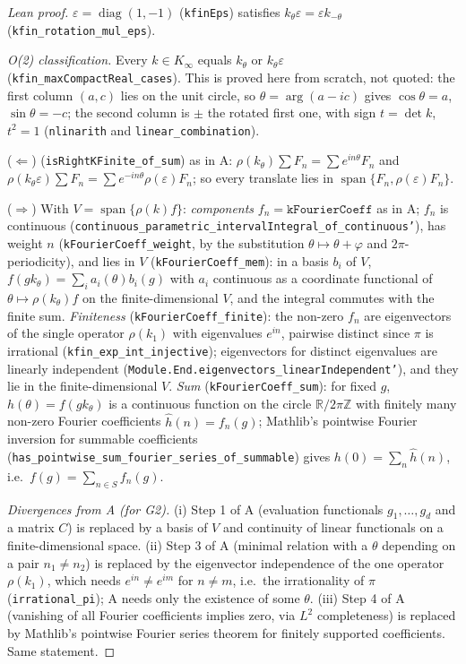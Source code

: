 \begin{proof}[Lean proof]
$\varepsilon=\operatorname{diag}(1,-1)$ (\texttt{kfinEps}) satisfies $k_\theta\varepsilon=\varepsilon k_{-\theta}$ (\texttt{kfin\_rotation\_mul\_eps}).

\emph{O(2) classification.} Every $k\in K_\infty$ equals $k_\theta$ or $k_\theta\varepsilon$ (\texttt{kfin\_maxCompactReal\_cases}). This is proved here from scratch, not quoted: the first column $(a,c)$ lies on the unit circle, so $\theta=\arg(a-ic)$ gives $\cos\theta=a$, $\sin\theta=-c$; the second column is $\pm$ the rotated first one, with sign $t=\det k$, $t^2=1$ (\texttt{nlinarith} and \texttt{linear\_combination}).

($\Leftarrow$) (\texttt{isRightKFinite\_of\_sum}) as in A: $\rho(k_\theta)\sum F_n=\sum e^{in\theta}F_n$ and $\rho(k_\theta\varepsilon)\sum F_n=\sum e^{-in\theta}\rho(\varepsilon)F_n$; so every translate lies in $\operatorname{span}\{F_n,\rho(\varepsilon)F_n\}$.

($\Rightarrow$) With $V=\operatorname{span}\{\rho(k)f\}$: \emph{components} $f_n=\texttt{kFourierCoeff}$ as in A; $f_n$ is continuous (\texttt{continuous\_parametric\_intervalIntegral\_of\_continuous'}), has weight $n$ (\texttt{kFourierCoeff\_weight}, by the substitution $\theta\mapsto\theta+\varphi$ and $2\pi$-periodicity), and lies in $V$ (\texttt{kFourierCoeff\_mem}): in a basis $b_i$ of $V$, $f(gk_\theta)=\sum_ia_i(\theta)b_i(g)$ with $a_i$ continuous as a coordinate functional of $\theta\mapsto\rho(k_\theta)f$ on the finite-dimensional $V$, and the integral commutes with the finite sum. \emph{Finiteness} (\texttt{kFourierCoeff\_finite}): the non-zero $f_n$ are eigenvectors of the single operator $\rho(k_1)$ with eigenvalues $e^{in}$, pairwise distinct since $\pi$ is irrational (\texttt{kfin\_exp\_int\_injective}); eigenvectors for distinct eigenvalues are linearly independent (\texttt{Module.End.eigenvectors\_linearIndependent'}), and they lie in the finite-dimensional $V$. \emph{Sum} (\texttt{kFourierCoeff\_sum}): for fixed $g$, $h(\theta)=f(gk_\theta)$ is a continuous function on the circle $\mathbb R/2\pi\mathbb Z$ with finitely many non-zero Fourier coefficients $\hat h(n)=f_n(g)$; Mathlib's pointwise Fourier inversion for summable coefficients (\texttt{has\_pointwise\_sum\_fourier\_series\_of\_summable}) gives $h(0)=\sum_n\hat h(n)$, i.e.\ $f(g)=\sum_{n\in S}f_n(g)$.

\emph{Divergences from A (for G2).} (i) Step 1 of A (evaluation functionals $g_1,\dots,g_d$ and a matrix $C$) is replaced by a basis of $V$ and continuity of linear functionals on a finite-dimensional space. (ii) Step 3 of A (minimal relation with a $\theta$ depending on a pair $n_1\ne n_2$) is replaced by the eigenvector independence of the one operator $\rho(k_1)$, which needs $e^{in}\ne e^{im}$ for $n\ne m$, i.e.\ the irrationality of $\pi$ (\texttt{irrational\_pi}); A needs only the existence of some $\theta$. (iii) Step 4 of A (vanishing of all Fourier coefficients implies zero, via $L^2$ completeness) is replaced by Mathlib's pointwise Fourier series theorem for finitely supported coefficients. Same statement.
\end{proof}


